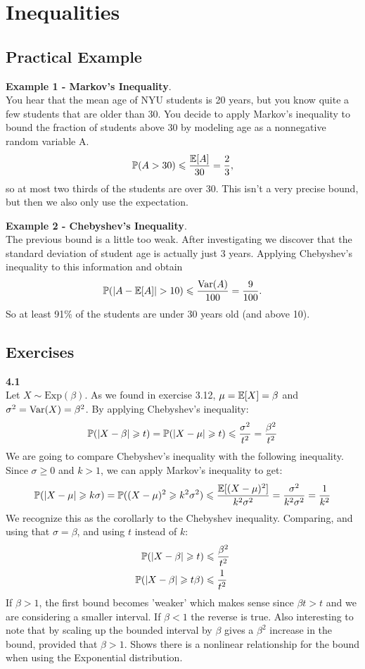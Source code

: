 
\newpage
\section{Inequalities}

\subsection*{Practical Example}
\textbf{Example 1 - Markov's Inequality}.\\
You hear that the mean age of NYU students is 20 years, but you know quite a few
students that are older than 30. You decide to apply Markov's inequality to bound
the fraction of students above 30 by modeling age as a nonnegative random variable A.
$$
\P(A > 30) \leq \frac{\E[A]}{30} = \frac{2}{3},
$$
so at most two thirds of the students are over 30.
This isn't a very precise bound, but then we also only use the expectation.

\medskip\noindent
\textbf{Example 2 - Chebyshev's Inequality}.\\
The previous bound is a little too weak. After investigating we discover that the
standard deviation of student age is actually just 3 years. Applying Chebyshev's
inequality to this information and obtain
$$
\P(|A - \E[A]| > 10) \leq \frac{\V(A)}{100} = \frac{9}{100}.
$$
So at least 91\% of the students are under 30 years old (and above 10).

\subsection*{Exercises}
\textbf{4.1}\\  %
Let $X\sim\text{Exp}(\beta)$. As we found in exercise 3.12, $\mu = \E[X] = \beta$ and
$\sigma^2 = \V(X) = \beta^2$. By applying Chebyshev's inequality:
$$
\P(|X-\beta|\geq t) = \P(|X-\mu|\geq t) \leq \frac{\sigma^2}{t^2} = \frac{\beta^2}{t^2}
$$
We are going to compare Chebyshev's inequality with the following inequality. Since $\sigma\geq 0$
and $k > 1$, we can apply Markov's inequality to get:
$$
\P(|X-\mu|\geq k\sigma) = \P((X-\mu)^2\geq k^2\sigma^2) \leq
\frac{\E[(X-\mu)^2]}{k^2\sigma^2} = \frac{\sigma^2}{k^2\sigma^2} = \frac{1}{k^2}
$$
We recognize this as the corollarly to the Chebyshev inequality. Comparing,
and using that $\sigma = \beta$, and using $t$ instead of $k$:
\begin{align*}
    \P(|X-\beta|\geq t) &\leq \frac{\beta^2}{t^2} \\
    \P(|X-\beta|\geq t\beta) &\leq \frac{1}{t^2}
\end{align*}
If $\beta > 1$, the first bound becomes 'weaker' which makes sense since $\beta t > t$ and
we are considering a smaller interval. If $\beta < 1$ the reverse is true. Also interesting
to note that by scaling up the bounded interval by $\beta$ gives a $\beta^2$ increase in the
bound, provided that $\beta > 1$. Shows there is a nonlinear relationship for the bound
when using the Exponential distribution.

